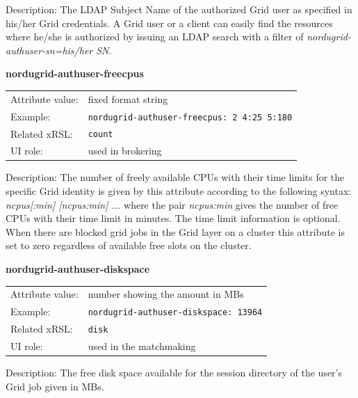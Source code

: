 \documentclass{article}
\begin{document}
Description:  The LDAP Subject Name of the authorized Grid user
as specified in his/her Grid credentials.
A Grid user or a client can easily find the resources where he/she is authorized
by issuing an LDAP search with a filter 
of {\it nordugrid-authuser-sn=his/her SN}.


  \hspace*{0.5cm}
  \begin{shaded}
    \textbf{nordugrid-authuser-freecpus}
  \end{shaded}
  \begin{tabular}{lp{10cm}}  
    Attribute value:& fixed format string\\
    Example:& \verb#nordugrid-authuser-freecpus: 2 4:25 5:180#\\
    Related xRSL:& \verb#count#\\
    UI role:& used in brokering\\ 
  \end{tabular}

Description:
The number of freely available CPUs with their time limits for the specific Grid identity 
is given by this attribute according to the following syntax: \\
{\it ncpus[:min] [ncpus:min] ...} where the pair {\it ncpus:min}  gives the number 
of free CPUs with their time limit in minutes. The time limit information is optional. 
When there are blocked grid jobs in the Grid layer on a cluster this attribute is set 
to zero regardless of available free slots on the cluster.
 

  \hspace*{0.5cm}
  \begin{shaded}
    \textbf{nordugrid-authuser-diskspace}
  \end{shaded}
  \begin{tabular}{lp{10cm}}  
    Attribute value:&  number showing the amount in MBs\\
    Example:& \verb#nordugrid-authuser-diskspace: 13964#\\
    Related xRSL:& \verb#disk#\\
    UI role:& used in the matchmaking\\
  \end{tabular}

Description: The free disk space available for the session directory of the 
user's Grid job given in MBs.
\end{document}
